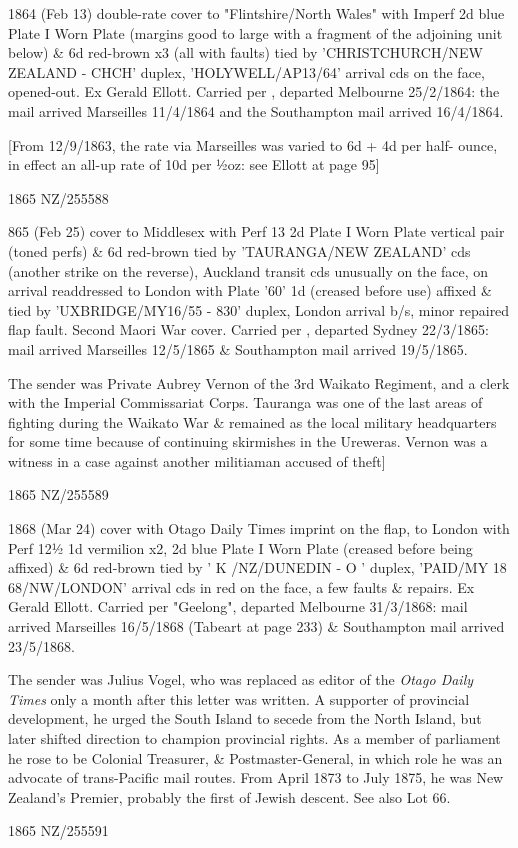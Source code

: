 \documentclass[justified]{tufte-book}
\begin{document}
%
{1864 (Feb 13) double-rate cover to "Flintshire/North Wales" with Imperf 2d blue Plate I Worn Plate (margins good to large with a fragment of the adjoining unit below) \& 6d red-brown x3 (all with faults) tied by 'CHRISTCHURCH/NEW ZEALAND - CHCH' duplex, 'HOLYWELL/AP13/64' arrival cds on the face, opened-out. Ex Gerald Ellott. Carried per , departed Melbourne 25/2/1864: the mail arrived Marseilles 11/4/1864 and the Southampton mail arrived 16/4/1864. 

[From 12/9/1863, the rate via Marseilles was varied to 6d + 4d per half- ounce, in effect an all-up rate of 10d per ½oz: see Ellott at page 95]}%
{1865}%
{NZ/255588}%
{}%
{}
{}%
{}%

%
{865 (Feb 25) cover to Middlesex with Perf 13 2d Plate I Worn Plate vertical pair (toned perfs) \& 6d red-brown tied by 'TAURANGA/NEW ZEALAND' cds (another strike on the reverse), Auckland transit cds unusually on the face, on arrival readdressed to London with Plate '60' 1d (creased before use) affixed \& tied by 'UXBRIDGE/MY16/55 - 830' duplex, London arrival b/s, minor repaired flap fault. Second Maori War cover. Carried per , departed Sydney 22/3/1865: mail arrived Marseilles 12/5/1865 \& Southampton mail arrived 19/5/1865. 

The sender was Private Aubrey Vernon of the 3rd Waikato Regiment, and a clerk with the Imperial Commissariat Corps. Tauranga was one of the last areas of fighting during the Waikato War \& remained as the local military headquarters for some time because of continuing skirmishes in the Ureweras. Vernon was a witness in a case against another militiaman accused of theft]}%
{1865}%
{NZ/255589}%
{}%
{}
{}%
{}%

%
{1868 (Mar 24) cover with Otago Daily Times imprint on the flap, to London with Perf 12½ 1d vermilion x2, 2d blue Plate I Worn Plate (creased before being affixed) \& 6d red-brown tied by ' K /NZ/DUNEDIN - O ' duplex, 'PAID/MY 18 68/NW/LONDON' arrival cds in red on the face, a few faults \& repairs. Ex Gerald Ellott. Carried per "Geelong", departed Melbourne 31/3/1868: mail arrived Marseilles 16/5/1868 (Tabeart at page 233) \& Southampton mail arrived 23/5/1868. 

The sender was Julius Vogel, who was replaced as editor of the \textit{Otago Daily Times} only a month after this letter was written. A supporter of provincial development, he urged the South Island to secede from the North Island, but later shifted direction to champion provincial rights. As a member of parliament he rose to be Colonial Treasurer, \& Postmaster-General, in which role he was an advocate of trans-Pacific mail routes. From April 1873 to July 1875, he was New Zealand's Premier, probably the first of Jewish descent. See also Lot 66.}%
{1865}%
{NZ/255591}%
{}%
{}
{}%
{}%
\end{document}
